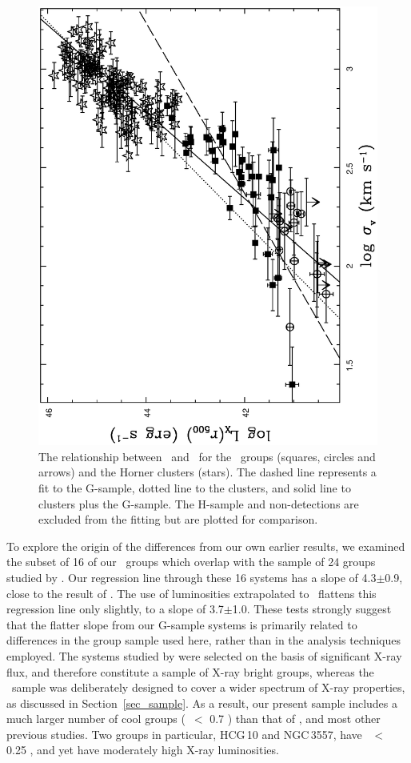 \documentclass[usenatbib]{mn2e}
\begin{document}
\begin{figure}
\begin{minipage}{241pt}
    \includegraphics[height=\linewidth,angle=270]{fig_15.ps}
    \caption{The relationship between \LXrfh\ and \sigmav\ for the \GEMS\ groups
             (squares, circles and arrows) and the Horner clusters (stars). The
             dashed line represents a fit to the G-sample, dotted line to the
             clusters, and solid line to clusters plus the G-sample. The H-sample
             and non-detections are excluded from the fitting but are plotted for
             comparison.}
    \label{fig_LXrfh_sigma_comp}

  \end{minipage}
\end{figure}

To explore the origin of the differences from our own earlier results, we
examined the subset of 16 of our \GEMS\ groups which overlap with the sample of 24
groups studied by \citet{helsdon00a}.  Our regression line through these 16
systems has a slope of 4.3$\pm$0.9, close to the result of \citet{helsdon00a}.
The use of luminosities extrapolated to \rfh\ flattens this regression line only
slightly, to a slope of 3.7$\pm$1.0.  These tests strongly suggest that the
flatter slope from our G-sample systems is primarily related to differences in
the group sample used here, rather than in the analysis techniques employed.  The
systems studied by \citet{helsdon00a} were selected on the basis of significant
X-ray flux, and therefore constitute a sample of X-ray bright groups, whereas the
\GEMS\ sample was deliberately designed to cover a wider spectrum of X-ray
properties, as discussed in Section~\ref{sec_sample}.  As a result, our present
sample includes a much larger number of cool groups (\TX\ $<$ 0.7 \kev) than that
of \citet{helsdon00a}, and most other previous studies. Two groups in particular,
HCG\,10 and NGC\,3557, have \TX\ $<$ 0.25 \kev, and yet have moderately high X-ray
luminosities.
\end{document}
